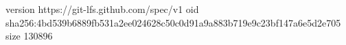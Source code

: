 version https://git-lfs.github.com/spec/v1
oid sha256:4bd539b6889fb531a2ee024628c50c0d91a9a883b719e9c23bf147a6e5d2e705
size 130896
